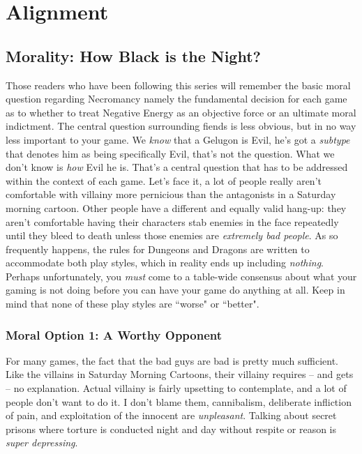 \section{Alignment}

\subsection{Morality: How Black is the Night?}

Those readers who have been following this series will remember the basic moral question regarding Necromancy namely the fundamental decision for each game as to whether to treat Negative Energy as an objective force or an ultimate moral indictment. The central question surrounding fiends is less obvious, but in no way less important to your game. We \textit{know} that a Gelugon is Evil, he's got a \textit{subtype} that denotes him as being specifically Evil, that's not the question. What we don't know is \textit{how} Evil he is. That's a central question that has to be addressed within the context of each game. Let's face it, a lot of people really aren't comfortable with villainy more pernicious than the antagonists in a Saturday morning cartoon. Other people have a different and equally valid hang-up: they aren't comfortable having their characters stab enemies in the face repeatedly until they bleed to death unless those enemies are \textit{extremely bad people}. As so frequently happens, the rules for Dungeons and Dragons are written to accommodate both play styles, which in reality ends up including \textit{nothing}. Perhaps unfortunately, you \textit{must} come to a table-wide consensus about what your gaming is not doing before you can have your game do anything at all.  Keep in mind that none of these play styles are ``worse" or ``better".\\

\subsubsection{Moral Option 1: A Worthy Opponent}
\vspace*{-8pt}

For many games, the fact that the bad guys are bad is pretty much sufficient. Like the villains in Saturday Morning Cartoons, their villainy requires -- and gets -- no explanation. Actual villainy is fairly upsetting to contemplate, and a lot of people don't want to do it. I don't blame them, cannibalism, deliberate infliction of pain, and exploitation of the innocent are \textit{unpleasant}. Talking about secret prisons where torture is conducted night and day without respite or reason is \textit{super depressing}.

